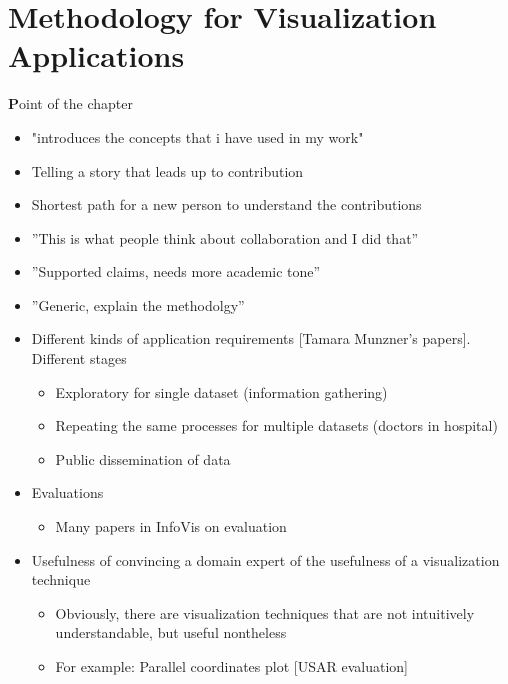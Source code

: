 \chapter{Methodology for Visualization Applications}
\label{cha:visapp}

{\textbf Point of the chapter}
\begin{itemize}
\item "introduces the concepts that i have used in my work"
\item Telling a story that leads up to contribution 
\item Shortest path for a new person to understand the contributions
\item ''This is what people think about collaboration and I did that''
\item ''Supported claims, needs more academic tone''
\item ''Generic, explain the methodolgy''
\end{itemize}

\begin{itemize}
  \item Different kinds of application requirements [Tamara Munzner's papers]. Different stages
  \begin{itemize}
    \item Exploratory for single dataset (information gathering)
    \item Repeating the same processes for multiple datasets (doctors in hospital)
    \item Public dissemination of data
  \end{itemize}
  \item Evaluations
  \begin{itemize}
    \item Many papers in InfoVis on evaluation
  \end{itemize}
  \item Usefulness of convincing a domain expert of the usefulness of a visualization technique
  \begin{itemize}
    \item Obviously, there are visualization techniques that are not intuitively understandable, but useful nontheless
    \item For example: Parallel coordinates plot [USAR evaluation]
  \end{itemize}
\end{itemize}

